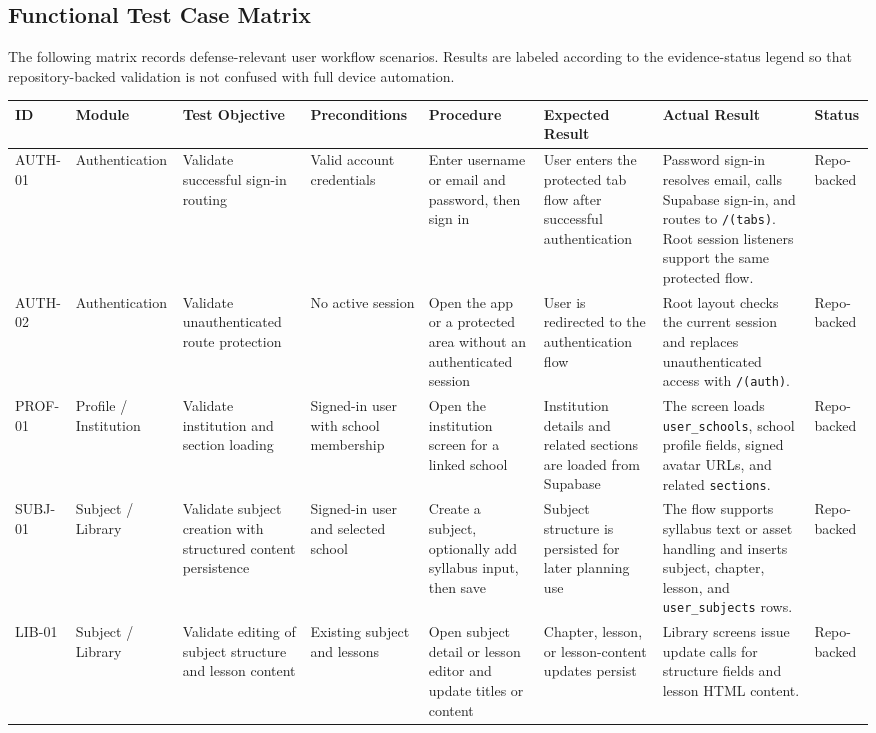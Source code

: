 \documentclass[12pt]{article}
\begin{document}
\subsection{Functional Test Case Matrix}

The following matrix records defense-relevant user workflow scenarios. Results are labeled according to the evidence-status legend so that repository-backed validation is not confused with full device automation.

\begingroup
\scriptsize
\begin{longtable}{|L{0.9cm}|L{1.7cm}|L{1.9cm}|L{1.6cm}|L{2.5cm}|L{2.4cm}|L{2.3cm}|L{1.4cm}|}
\hline
\textbf{ID} & \textbf{Module} & \textbf{Test Objective} & \textbf{Preconditions} & \textbf{Procedure} & \textbf{Expected Result} & \textbf{Actual Result} & \textbf{Status} \\
\hline
AUTH-01 & Authentication & Validate successful sign-in routing & Valid account credentials & Enter username or email and password, then sign in & User enters the protected tab flow after successful authentication & Password sign-in resolves email, calls Supabase sign-in, and routes to \texttt{/(tabs)}. Root session listeners support the same protected flow. & Repo-backed \\
\hline
AUTH-02 & Authentication & Validate unauthenticated route protection & No active session & Open the app or a protected area without an authenticated session & User is redirected to the authentication flow & Root layout checks the current session and replaces unauthenticated access with \texttt{/(auth)}. & Repo-backed \\
\hline
PROF-01 & Profile / Institution & Validate institution and section loading & Signed-in user with school membership & Open the institution screen for a linked school & Institution details and related sections are loaded from Supabase & The screen loads \texttt{user\_schools}, school profile fields, signed avatar URLs, and related \texttt{sections}. & Repo-backed \\
\hline
SUBJ-01 & Subject / Library & Validate subject creation with structured content persistence & Signed-in user and selected school & Create a subject, optionally add syllabus input, then save & Subject structure is persisted for later planning use & The flow supports syllabus text or asset handling and inserts subject, chapter, lesson, and \texttt{user\_subjects} rows. & Repo-backed \\
\hline
LIB-01 & Subject / Library & Validate editing of subject structure and lesson content & Existing subject and lessons & Open subject detail or lesson editor and update titles or content & Chapter, lesson, or lesson-content updates persist & Library screens issue update calls for structure fields and lesson HTML content. & Repo-backed \\

\end{longtable}
\end{document}

